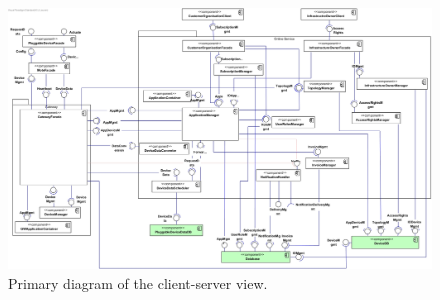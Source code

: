 
    \begin{figure}[!htp]
    	\centering
    	\includegraphics[width=\textwidth]{images/component-primary}
    	\caption{Primary diagram of the client-server view.}\label{fig:cc-primary}
    \end{figure}
